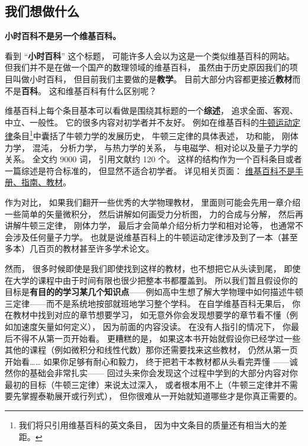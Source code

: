 
\subsection{我们想做什么}
\textbf{小时百科不是另一个维基百科。}

看到 “\textbf{小时百科}” 这个标题， 可能许多人会以为这是一个类似维基百科的网站。 但我们并不是在做一个国产的数理领域的维基百科， 虽然由于历史原因我们的项目叫做小时百科， 但目前我们主要做的是\textbf{教学}。 目前大部分内容都更接近\textbf{教材}而不是\textbf{百科}。 这和维基百科有什么区别呢？

维基百科上每个条目基本可以看做是围绕其标题的一个\textbf{综述}， 追求全面、客观、中立、一般性。 它的很多内容对初学者并不友好。 例如在维基百科的\href{https://en.wikipedia.org/wiki/Newton's_laws_of_motion}{牛顿运动定律}条目\footnote{我们将只引用维基百科的英文条目， 因为中文条目的质量还有相当大的差距。}中囊括了牛顿力学的发展历史， 牛顿三定律的具体表述， 功和能， 刚体力学， 混沌， 分析力学， 与热力学的关系， 与电磁学、相对论以及量子力学的关系。 全文约 9000 词， 引用文献约 120 个。 这样的结构作为一个百科条目或者一篇综述是符合标准的， 但显然不适合初学者。 详见相关页面： \href{https://en.wikipedia.org/wiki/Wikipedia:What_Wikipedia_is_not}{维基百科不是手册、指南、教材}。

作为对比， 如果我们翻开一些优秀的大学物理教材， 里面则可能会先用一章介绍一些简单的矢量微积分， 然后讲解如何画受力分析图， 力的合成与分解， 然后再讲解牛顿三定律， 刚体力学， 最后才会简单介绍分析力学和相对论等， 也通常不会涉及任何量子力学。 也就是说维基百科上的牛顿运动定律涉及到了一本（甚至多本）几百页的教材甚至许多学术论文。

然而， 很多时候即使是我们即使找到这样的教材，也不想把它从头读到尾， 即使在大学的课程中由于时间有限也很少把整本书都覆盖到。 所以我们暂且假设你的目标是\textbf{有目的的学习某几个知识点}——例如高中生想了解大学物理中如何描述牛顿三定律——而不是系统地按部就班地学习整个学科。 在自学维基百科无果后， 你在教材中找到对应的章节想要学习， 如无意外你会发现想要学的章节看不懂（例如加速度矢量如何定义）， 因为前面的内容没读。 在没有人指引的情况下， 你最后不得不从第一页开始看。 更糟糕的是， 如果这本书开始就假设你已经学过一些其他的课程（例如微积分和线性代数）那你还需要找来这些教材， 仍然从第一页开始看…… 如果你足够有耐心和毅力， 终于把若干本教材都从头看完弄懂 ——诚然你的基础会非常扎实—— 回过头来你会发现这个过程中学到的大部分内容对你最初的目标（牛顿三定律）来说太过深入， 或者根本用不上（牛顿三定律并不需要先掌握泰勒展开或行列式）， 但你很难从一开始就知道哪些才是你真正需要的。

